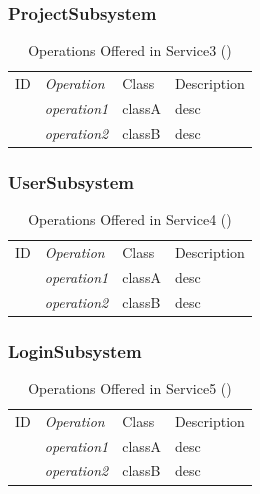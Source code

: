 \documentclass[12pt,letterpaper]{article}
\begin{document}
\subsubsection*{ProjectSubsystem}

\begin{table}[H]
\caption{Operations Offered in Service3 ()} 
\begin{tabu} to 
	\tableheader{}ID & Operation & Class & Description\\
	 & operation1 & classA & desc\\
	 & operation2 & classB & desc\\
\end{tabu}
\end{table}

\subsubsection*{UserSubsystem}

\begin{table}[H]
\caption{Operations Offered in Service4 ()} 
\begin{tabu} to 
	\tableheader{}ID & Operation & Class & Description\\
	 & operation1 & classA & desc\\
	 & operation2 & classB & desc\\
\end{tabu}
\end{table}



\subsubsection*{LoginSubsystem}

\begin{table}[H]
\caption{Operations Offered in Service5 ()} 
\begin{tabu} to 
	\tableheader{}ID & Operation & Class & Description\\
	 & operation1 & classA & desc\\
	 & operation2 & classB & desc\\
\end{tabu}
\end{table}
\end{document}
